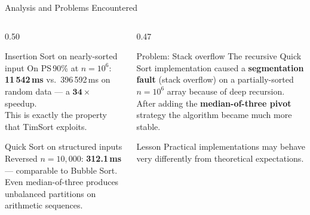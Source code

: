 \documentclass[aspectratio=169]{beamer}
\begin{document}
\begin{frame}{Analysis and Problems Encountered}
  \begin{columns}[T]
    \begin{column}{0.50\textwidth}
      \begin{block}{Insertion Sort on nearly-sorted input}
        On PS\,90\% at $n=10^6$: \textbf{11\,542\,ms} vs.\ 396\,592\,ms on random
        data --- a $\mathbf{34\times}$ speedup.\\[0.3em]
        This is exactly the property that TimSort exploits.
      \end{block}
      \vspace{0.5em}
      \begin{block}{Quick Sort on structured inputs}
        Reversed $n=10{,}000$: \textbf{312.1\,ms} --- comparable to Bubble Sort.\\[0.3em]
        Even median-of-three produces unbalanced partitions on arithmetic sequences.
      \end{block}
    \end{column}
    \begin{column}{0.47\textwidth}
      \begin{alertblock}{Problem: Stack overflow}
        The recursive Quick Sort implementation caused a \textbf{segmentation fault}
        (stack overflow) on a partially-sorted $n=10^6$ array because of deep
        recursion.\\[0.3em]
        After adding the \textbf{median-of-three pivot} strategy the algorithm
        became much more stable.
      \end{alertblock}
      \vspace{0.5em}
      \begin{exampleblock}{Lesson}
        Practical implementations may behave very differently from theoretical
        expectations.
      \end{exampleblock}
    \end{column}
  \end{columns}
\end{frame}
\end{document}
